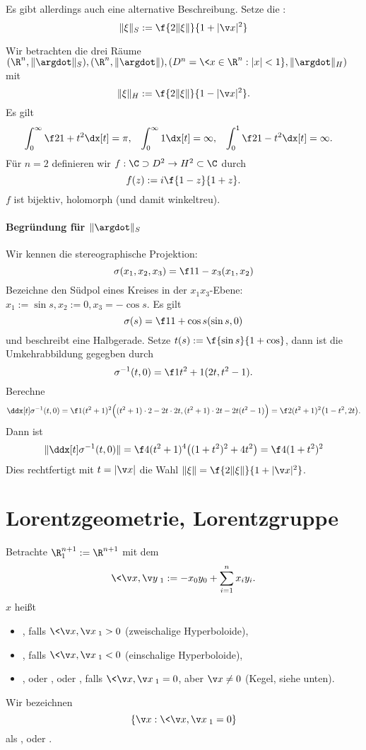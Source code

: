 Es gibt allerdings auch eine alternative Beschreibung.
Setze die :
\[
	\|\xi\|_S := \f {2\|\xi\|}{1 + |\v x|^2}
\]

Wir betrachten die drei Räume $(\R^n, \|\argdot\|_S), (\R^n, \|\argdot\|), (D^n = \<x \in \R^n : |x| < 1 \}, \|\argdot\|_H)$
mit
\[
	\|\xi\|_H := \f {2\|\xi\|}{1 - |\v x|^2}.
\]
Es gilt
\begin{align*}
	\int_0^\infty \f 2{1+t^2} \dx[t] &= \pi, &
	\int_0^\infty 1 \dx[t] &= \infty, &
	\int_0^1 \f 2{1-t^2} \dx[t] &= \infty.
\end{align*}
Für $n=2$ definieren wir $f: \C \supset D^2 \to H^2 \subset \C$ durch
\[
	f(z) := i \f {1-z}{1+z}.
\]
$f$ ist bijektiv, holomorph (und damit winkeltreu).

\paragraph{Begründung für $\|\argdot\|_S$}

Wir kennen die stereographische Projektion:
\[
	\sigma(x_1, x_2, x_3) = \f 1{1-x_3} (x_1, x_2)
\]
Bezeichne den Südpol eines Kreises in der $x_1x_3$-Ebene: $x_1 := \sin s, x_2 := 0, x_3 = -\cos s$.
Es gilt
\[
	\sigma(s) = \f 1{1 + \cos s} (\sin s, 0)
\]
und beschreibt eine Halbgerade.
Setze $t(s) := \f {\sin s}{1 + \cos}$, dann ist die Umkehrabbildung gegegben durch
\[
	\sigma^{-1}(t, 0)
	= \f 1{t^2 + 1} (2t, t^2 - 1).
\]
Berechne
\[
	\ddx[t] \sigma^{-1}(t, 0)
	= \f 1{(t^2 + 1)^2} \Big( (t^2 + 1) \cdot 2 - 2t \cdot 2t, (t^2 + 1)\cdot 2t - 2t (t^2 - 1) \Big) \\
	= \f 2{(t^2 + 1)^2} \big( 1 - t^2, 2t \big).
\]
Dann ist
\[
	\| \ddx[t] \sigma^{-1} (t, 0) \|
	= \f 4{(t^2 + 1)^4} \big( (1+t^2)^2 + 4t^2 \big)
	= \f 4{(1+t^2)^2}
\]
Dies rechtfertigt mit $t = |\v x|$ die Wahl $\|\xi\| = \f {2\|\xi\|}{1 + |\v x|^2}$.


\section{Lorentzgeometrie, Lorentzgruppe}

Betrachte $\R_1^{n+1} := \R^{n+1}$ mit dem 
\[
	\< \v x, \v y \>_1 :=
	-x_0 y_0 + \sum_{i=1}^n x_i y_i.
\]
$x$ heißt
\begin{itemize}
	\item
		, falls $\<\v x, \v x\>_1 > 0$ (zweischalige Hyperboloide),
	\item
		, falls $\<\v x, \v x\>_1 < 0$ (einschalige Hyperboloide),
	\item
		, oder , oder , falls $\<\v x, \v x\>_1 = 0$, aber $\v x \neq 0$ (Kegel, siehe unten).
\end{itemize}
Wir bezeichnen
\[
	\{ \v x : \<\v x, \v x\>_1 = 0 \}
\]
als , oder .

